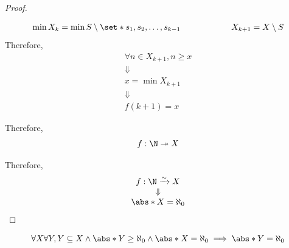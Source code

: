 \begin{proof}
\begin{itemize}
\begin{itemize}
\[\begin{array}{c@{\qquad\qquad\qquad}c}
                      \min X_{k} = \min S \setminus \set*{s_{1}, s_{2}, \dots, s_{k - 1}}
                       & X_{k + 1} = X \setminus S
                    \end{array}
                  \]
                  Therefore,
                  \[
                    \begin{array}{c}
                      \forall n \in X_{k + 1}, n \geq x \\
                      \Downarrow                        \\
                      x = \min X_{k + 1}                \\
                      \Downarrow                        \\
                      f(k + 1) = x
                    \end{array}
                  \]
          \end{itemize}
          Therefore,
          \[
            f: \N \twoheadrightarrow X
          \]
  \end{itemize}
  Therefore,
  \[
    \begin{array}{c}
      f: \N \xrightarrow{\sim} X \\
      \Downarrow                 \\
      \abs*{X} = \aleph_{0}
    \end{array}
  \]
\end{proof}

\bigskip

\begin{theorem} \label{an:thm:infinite-subset-of-countable-set-is-countable}
  \[
    \forall X \forall Y, Y \subseteq X \land \abs*{Y} \geq \aleph_{0} \land \abs*{X} = \aleph_{0}
    \implies \abs*{Y} = \aleph_{0}
  \]
\end{theorem}

